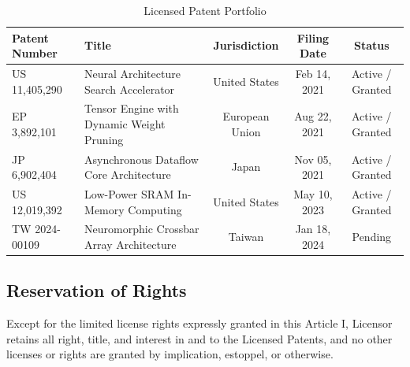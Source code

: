 \begin{table}[h]
  \centering
  \caption{Licensed Patent Portfolio}
  \label{tab:patents}
  \begin{tabularx}{\textwidth}{l X c c c}
    \toprule
    \textbf{Patent Number} & \textbf{Title} & \textbf{Jurisdiction} & \textbf{Filing Date} & \textbf{Status} \\
    \midrule
    US 11,405,290 & Neural Architecture Search Accelerator & United States & Feb 14, 2021 & Active / Granted \\
    EP 3,892,101 & Tensor Engine with Dynamic Weight Pruning & European Union & Aug 22, 2021 & Active / Granted \\
    JP 6,902,404 & Asynchronous Dataflow Core Architecture & Japan & Nov 05, 2021 & Active / Granted \\
    US 12,019,392 & Low-Power SRAM In-Memory Computing & United States & May 10, 2023 & Active / Granted \\
    TW 2024-00109 & Neuromorphic Crossbar Array Architecture & Taiwan & Jan 18, 2024 & Pending \\
    \bottomrule
  \end{tabularx}
\end{table}

\subsection{Reservation of Rights} Except for the limited license rights expressly granted in this Article I, Licensor retains all right, title, and interest in and to the Licensed Patents, and no other licenses or rights are granted by implication, estoppel, or otherwise.
